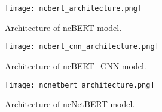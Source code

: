 \documentclass[
	a4paper, %
	10pt, %
	unnumberedsections, %
	twoside, %
]{t0003}
\begin{document}
\begin{figure*}
	\texttt{[image: ncbert\_architecture.png]}
	\caption{Architecture of ncBERT model.}
	\label{fig:ncbert}
\end{figure*}

\begin{figure*}
	\texttt{[image: ncbert\_cnn\_architecture.png]}
	\caption{Architecture of ncBERT\_CNN model.}
	\label{fig:ncbertcnn}
\end{figure*}

\begin{figure*}
	\texttt{[image: ncnetbert\_architecture.png]}
	\caption{Architecture of ncNetBERT model.}
	\label{fig:ncnetbert}
\end{figure*}
\end{document}
